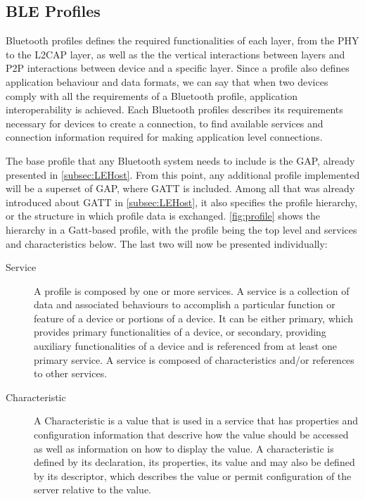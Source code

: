 \subsection{\ac{BLE} Profiles}
\label{subsec:BLEProfile}


Bluetooth profiles defines the required functionalities of each layer, from the \ac{PHY} to the \ac{L2CAP} layer, as well as the the vertical interactions between layers and \ac{P2P} interactions between device and a specific layer. Since a profile also defines application behaviour and data formats, we can say that when two devices comply with all the requirements of a Bluetooth profile, application interoperability is achieved. Each Bluetooth profiles describes its requirements necessary for devices to create a connection, to find available services and connection information required for making application level connections.

The base profile that any Bluetooth system needs to include is the \ac{GAP}, already presented in \ref{subsec:LEHost}. From this point, any additional profile implemented will be a superset of \ac{GAP}, where \ac{GATT} is included. Among all that was already introduced about \ac{GATT} in \ref{subsec:LEHost}, it also specifies the profile hierarchy, or the structure in which profile data is exchanged.  \ref{fig:profile} shows the hierarchy in a Gatt-based profile, with the profile being the top level and services and characteristics below. The last two will now be presented individually:

\begin{description}

\item[Service] A profile is composed by one or more services. A service is a collection of data and associated behaviours to accomplish a particular function or feature of a device or portions of a device. It can be either primary, which provides primary functionalities of a device, or secondary, providing auxiliary functionalities of a device and is referenced from at least one primary service. A service is composed of characteristics and/or references to other services.

\item[Characteristic] A Characteristic is a value that is used in a service that has properties and configuration information that descrive how the value should be accessed as well as information on how to display the value. A characteristic is defined by its declaration, its properties, its value and may also be defined by its descriptor, which describes the value or permit configuration of
the server relative to the value.
\end{description}

